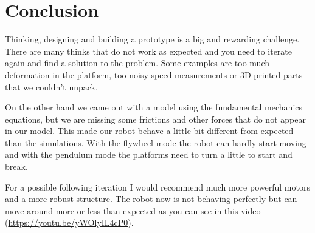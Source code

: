 \section{Conclusion}
Thinking, designing and building a prototype is a big and rewarding challenge.
There are many thinks that do not work as expected and you need to iterate again
and find a solution to the problem. Some examples are too much deformation in the platform,
too noisy speed measurements or 3D printed parts that we couldn't unpack.

On the other hand we came out with a model using the fundamental mechanics equations, but we are missing
some frictions and other forces that do not appear in our model. This made our robot behave a little bit
different from expected than the simulations. With the flywheel mode the robot can hardly start moving and with
the pendulum mode the platforms need to turn a little to start and break.

For a possible following iteration I would recommend much more powerful motors and a more robust structure.
The robot now is not behaving perfectly but can move around more or less than expected as you can see in this
\href{https://youtu.be/yWOlyIL4cP0}{video} (\href{https://youtu.be/yWOlyIL4cP0}{https://youtu.be/yWOlyIL4cP0}).
